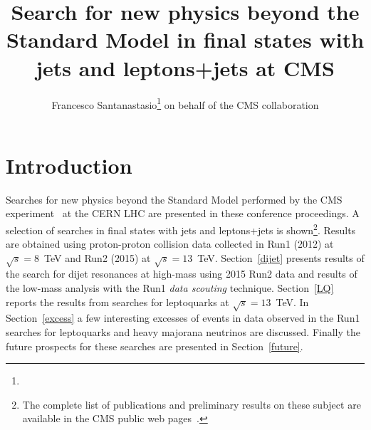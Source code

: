 \documentclass[epj]{webofc}
\begin{document}
%
\title{Search for new physics beyond the Standard Model in final states with jets and
  leptons+jets at CMS}
%
%

\author{Francesco
  Santanastasio\fnsep\thanks{}
  on behalf of the CMS collaboration
}


%
\maketitle
%
\section{Introduction}
\label{intro}
Searches for new physics beyond the Standard Model performed 
by the CMS experiment~\cite{Chatrchyan:2008aa} at the CERN LHC are presented in these conference proceedings.
A selection of searches in final states with jets and leptons+jets is
shown\footnote{The complete list of
publications and preliminary results on these subject are available 
in the CMS public web pages~\cite{EXOpages}.}. Results are obtained using proton-proton collision data 
collected in Run1 (2012) at $\sqrt{s}=8$~TeV and Run2 (2015) at $\sqrt{s}=13$~TeV.
Section~\ref{dijet} presents results of the search for dijet
resonances at high-mass using 2015 Run2 data and results 
of the low-mass analysis with the Run1 {\it data scouting} technique. 
Section~\ref{LQ} reports the results from searches for leptoquarks at
$\sqrt{s}=13$~TeV. In Section~\ref{excess} a few interesting excesses
of events in data observed in the Run1 searches for leptoquarks and
heavy majorana neutrinos are discussed. Finally the future prospects for
these searches are presented in Section~\ref{future}.
\end{document}
